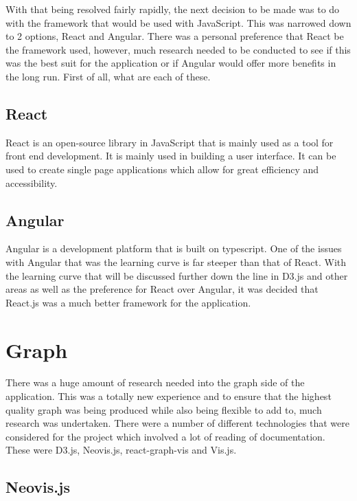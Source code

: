With that being resolved fairly rapidly, the next decision to be made was to do with the framework that would be used with JavaScript. This was narrowed down to 2 options, React and Angular. There was a personal preference that React be the framework used, however, much research needed to be conducted to see if this was the best suit for the application or if Angular would offer more benefits in the long run. First of all, what are each of these. \\

\subsection{React}

React is an open-source library in JavaScript that is mainly used as a tool for front end development. It is mainly used in building a user interface. It can be used to create single page applications which allow for great efficiency and accessibility.\cite{AngularvsReact}\\

\subsection{Angular}

Angular is a development platform that is built on typescript. One of the issues with Angular that was the learning curve is far steeper than that of React. With the learning curve that will be discussed further down the line in D3.js and other areas as well as the preference for React over Angular, it was decided that React.js was a much better framework for the application.\cite{AngularvsReact} \\

\section{Graph}

There was a huge amount of research needed into the graph side of the application. This was a totally new experience and to ensure that the highest quality graph was being produced while also being flexible to add to, much research was undertaken. There were a number of different technologies that were considered for the project which involved a lot of reading of documentation. These were D3.js, Neovis.js, react-graph-vis and Vis.js. \\

\subsection{Neovis.js}

